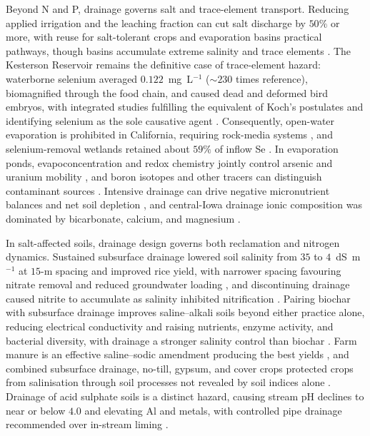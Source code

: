 Beyond N and P, drainage governs salt and trace-element transport. Reducing
applied irrigation and the leaching fraction can cut salt discharge by $50\%$
or more, with reuse for salt-tolerant crops and evaporation basins practical
pathways, though basins accumulate extreme salinity and trace elements
\parencite{WESTCOT1988}. The Kesterson Reservoir remains the definitive case
of trace-element hazard: waterborne selenium averaged $0.122$~mg~L$^{-1}$
($\sim230$ times reference), biomagnified through the food chain, and caused
dead and deformed bird embryos, with integrated studies fulfilling the
equivalent of Koch's postulates and identifying selenium as the sole causative
agent \parencite{SAIKI1987,Ohlendorf2002,BENSON1993}. Consequently, open-water
evaporation is prohibited in California, requiring rock-media systems
\parencite{Ayars2014,BRADFORD1991}, and selenium-removal wetlands retained
about $59\%$ of inflow Se \parencite{Gao2003}. In evaporation ponds,
evapoconcentration and redox chemistry jointly control arsenic and uranium
mobility \parencite{Ryu2010,Gao2007,Duff1997}, and boron isotopes and other
tracers can distinguish contaminant sources \parencite{Tayfur2010,Komor1997,Zhou2023}.
Intensive drainage can drive negative micronutrient balances and net soil
depletion \parencite{Gul2013}, and central-Iowa drainage ionic composition was
dominated by bicarbonate, calcium, and magnesium \parencite{Zimmerman2017b}.

In salt-affected soils, drainage design governs both reclamation and nitrogen
dynamics. Sustained subsurface drainage lowered soil salinity from $35$ to
$4$~dS~m$^{-1}$ at $15$-m spacing and improved rice yield, with narrower
spacing favouring nitrate removal and reduced groundwater loading
\parencite{Singh2002,Singh2001c,Gafni2001}, and discontinuing drainage caused
nitrite to accumulate as salinity inhibited nitrification \parencite{Singh2007}.
Pairing biochar with subsurface drainage improves saline--alkali soils beyond
either practice alone, reducing electrical conductivity and raising nutrients,
enzyme activity, and bacterial diversity, with drainage a stronger salinity
control than biochar \parencite{Tian2023b,Liu2025f,Xiong2025}. Farm manure is
an effective saline--sodic amendment producing the best yields
\parencite{Qadir2001}, and combined subsurface drainage, no-till, gypsum, and
cover crops protected crops from salinisation through soil processes not
revealed by soil indices alone \parencite{Daigh2025,Zhang2024d,Zhu2025}.
Drainage of acid sulphate soils is a distinct hazard, causing stream pH
declines to near or below $4.0$ and elevating Al and metals, with controlled
pipe drainage recommended over in-stream liming
\parencite{Osterholm2005,Åström2005,Virtanen2017,Salo2023}.

